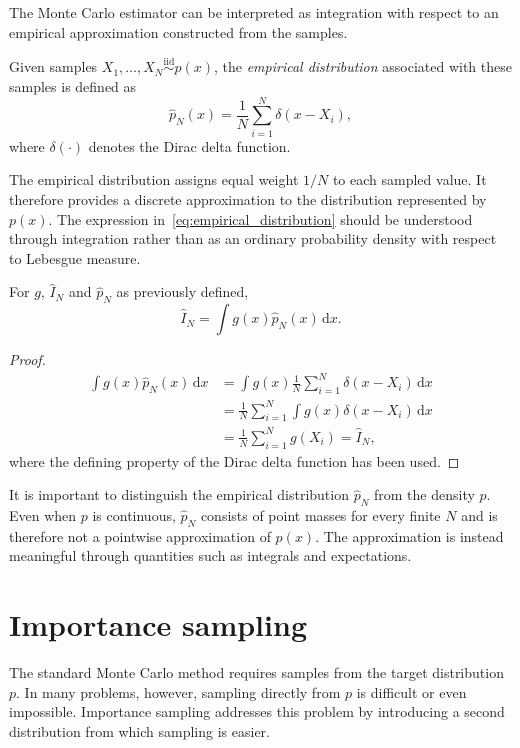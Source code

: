The Monte Carlo estimator can be interpreted as integration with respect to an empirical approximation constructed from the samples.

\begin{definition}
Given samples $X_1,\ldots,X_N \overset{\mathrm{iid}}{\sim} p(x)$, the \emph{empirical distribution} associated with these samples is defined as
\begin{equation}
    \hat{p}_N(x)
    = \frac{1}{N}\sum_{i=1}^{N}\delta(x-X_i),
    \label{eq:empirical_distribution}
\end{equation}
where $\delta(\cdot)$ denotes the Dirac delta function.
\end{definition}

The empirical distribution assigns equal weight $1/N$ to each sampled value. It therefore provides a discrete approximation to the distribution represented by $p(x)$. The expression in~\eqref{eq:empirical_distribution} should be understood through integration rather than as an ordinary probability density with respect to Lebesgue measure.

\begin{proposition}
For $g$, $\hat{I}_N$ and $\hat{p}_N$ as previously defined,
\begin{equation}
    \hat{I}_N = \int g(x)\hat{p}_N(x)\,\mathrm{d}x.
\end{equation}
\end{proposition}

\begin{proof}
    \begin{align}
        \int g(x)\hat{p}_N(x)\,\mathrm{d}x &= \int g(x) \frac{1}{N}\sum_{i=1}^N \delta(x-X_i)\,\mathrm{d}x \\
        &= \frac{1}{N}\sum_{i=1}^N \int g(x)\delta(x-X_i)\,\mathrm{d}x \\
        &= \frac{1}{N}\sum_{i=1}^N g(X_i) = \hat{I}_N,
    \end{align}
    where the defining property of the Dirac delta function has been used.
\end{proof}

It is important to distinguish the empirical distribution $\hat{p}_N$ from the density $p$. Even when $p$ is continuous, $\hat{p}_N$ consists of point masses for every finite $N$ and is therefore not a pointwise approximation of $p(x)$. The approximation is instead meaningful through quantities such as integrals and expectations.

\section{Importance sampling}
\label{sec:importance_sampling}
The standard Monte Carlo method requires samples from the target distribution $p$. In many problems, however, sampling directly from $p$ is difficult or even impossible.
Importance sampling addresses this problem by introducing a second distribution from which sampling is easier.

